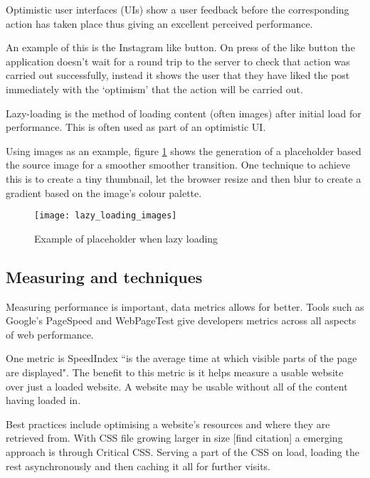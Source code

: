 Optimistic user interfaces (UIs) show a user feedback before the corresponding action has taken place thus giving an excellent perceived performance.

An example of this is the Instagram like button. On press of the like button the application doesn't wait for a round trip to the server to check that action was carried out successfully, instead it shows the user that they have liked the post immediately with the `optimism' that the action will be carried out. \cite{performing_actions_optimisitically}

Lazy-loading is the method of loading content (often images) after initial load for performance. This is often used as part of an optimistic UI.

Using images as an example, figure \ref{figure-lazy-loading-images} shows the generation of a placeholder based the source image for a smoother smoother transition. One technique to achieve this is to create a tiny thumbnail, let the browser resize and then blur to create a gradient based on the image's colour palette. \cite{image_colours_lazy_loading}

\begin{figure}[H]
  \centering
    \texttt{[image: lazy\_loading\_images]}
  \caption{Example of placeholder when lazy loading \protect\cite{image_colours_lazy_loading}}
  \label{figure-lazy-loading-images}
\end{figure}

\subsection{Measuring and techniques} \label{l-r--measuring-and-techniques}

Measuring performance is important, data metrics allows for better. Tools such as Google's PageSpeed and WebPageTest give developers metrics across all aspects of web performance.

One metric is SpeedIndex ``is the average time at which visible parts of the page are displayed". The benefit to this metric is it helps measure a usable website over just a loaded website. A website may be usable without all of the content having loaded in. \cite{speed_index}

Best practices include optimising a website's resources and where they are retrieved from. With CSS file growing larger in size [find citation] a emerging approach is through Critical CSS. Serving a part of the CSS on load, loading the rest asynchronously and then caching it all for further visits. \cite{fast_as_heck}

